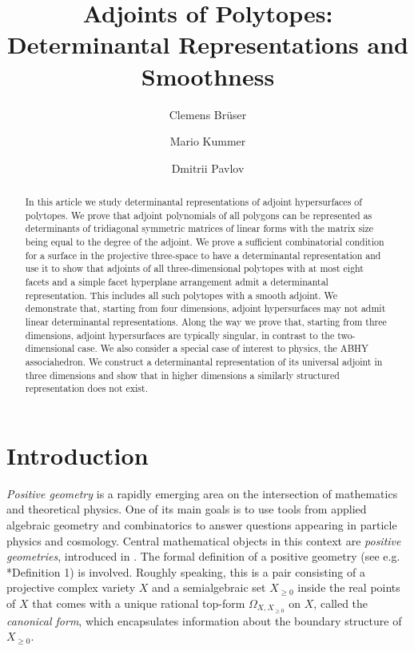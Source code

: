 \documentclass[a4paper,10pt]{amsart}
\title[Determinantal Representations of Adjoints]{Adjoints of Polytopes: Determinantal Representations and Smoothness}
\author{Clemens Brüser}
\author{Mario Kummer}
\author{Dmitrii Pavlov}
\theoremstyle{definition}
\theoremstyle{plain}
\begin{document}



\begin{abstract}
 In this article we study determinantal representations of adjoint hypersurfaces of polytopes. We prove that adjoint polynomials of all polygons can be represented as determinants of tridiagonal symmetric matrices of linear forms with the matrix size being equal to the degree of the adjoint. We prove a sufficient combinatorial condition for a surface in the projective three-space to have a determinantal representation and use it to show that adjoints of all three-dimensional polytopes with at most eight facets and a simple facet hyperplane arrangement admit a determinantal representation. This includes all such polytopes with a smooth adjoint. We demonstrate that, starting from four dimensions, adjoint hypersurfaces may not admit linear determinantal representations. Along the way we prove that, starting from three dimensions, adjoint hypersurfaces are typically singular, in contrast to the two-dimensional case. We also consider a special case of interest to physics, the ABHY associahedron. We construct a determinantal representation of its universal adjoint in three dimensions and show that in higher dimensions a similarly structured representation does not exist. 
\end{abstract}
\maketitle
\section{Introduction}
\emph{Positive geometry} \cite{ranestad2025positive} is a rapidly emerging area on the intersection of mathematics and theoretical physics. One of its main goals is to use tools from applied algebraic geometry and combinatorics to answer questions appearing in particle physics and cosmology. Central mathematical objects in this context are \emph{positive geometries}, introduced in \cite{arkani2017positive}. The formal definition of a positive geometry (see e.g. \cite{Lam2022PosGeom}*{Definition 1}) is involved. Roughly speaking, this is a pair consisting of a projective complex variety $X$ and a semialgebraic set $X_{\geq 0}$ inside the real points of $X$ that comes with a unique rational top-form $\Omega_{X,X_{\geq 0}}$ on $X$, called the \emph{canonical form}, which encapsulates information about the boundary structure of $X_{\geq 0}$. 
\end{document}
